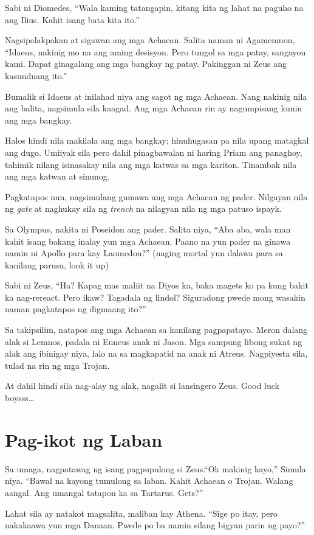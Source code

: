 \documentclass[12pt,letterpaper]{report}
\begin{document}
Sabi ni Diomedes, ``Wala kaming tatangapin, kitang kita ng lahat na paguho na ang Ilius. Kahit isang bata kita ito.''

Nagsipalakpakan at sigawan ang mga Achaean. Salita naman ni Agamemnon, ``Idaeus, nakinig mo na ang aming desisyon. Pero tungol sa mga patay, sangayon kami. Dapat ginagalang ang mga bangkay ng patay. Pakinggan ni Zeus ang kasunduang ito.''

Bumalik si Idaeus at inilahad niya ang sagot ng mga Achaean. Nang nakinig nila ang balita, nagsimula sila kaagad. Ang mga Achaean rin ay nagumpisang kunin ang mga bangkay.

Halos hindi nila makilala ang mga bangkay; hinuhugasan pa nila upang matagkal ang dugo. Umiiyak sila pero dahil pinagbawalan ni haring Priam ang panaghoy, tahimik nilang isinasakay nila ang mga katwas sa mga kariton. Tinambak nila ang mga katwan at sinunog.

Pagkatapos nun, nagsimulang gumawa ang mga Achaean ng pader. Nilgayan nila ng \textit{gate} at naghukay sila ng \textit{trench} na nilagyan nila ng mga patuso ispayk.

Sa Olympus, nakita ni Poseidon ang pader. Salita niya, ``Aba aba, wala man kahit isang bakang inalay yun mga Achaean. Paano na yun pader na ginawa namin ni Apollo para kay Laomedon?'' (naging mortal yun dalawa para sa kanilang parusa, look it up)

Sabi ni Zeus, ``Ha? Kapag mas maliit na Diyos ka, baka magets ko pa kung bakit ka nag-rereact. Pero ikaw? Tagadala ng lindol? Siguradong pwede mong wasakin naman pagkatapos ng digmaang ito?''

Sa takipsilim, natapos ang mga Achaean sa kanilang pagpapatayo. Meron dalang alak si Lemnos, padala ni Euneus anak ni Jason. Mga sampung libong sukat ng alak ang ibinigay niya, lalo na sa magkapatid na anak ni Atreus. Nagpiyesta sila, tulad na rin ng mga Trojan.

At dahil hindi sila nag-alay ng alak, nagalit si lansingero Zeus. Good luck boysss\dots

\pagebreak
\chapter{Pag-ikot ng Laban} %
Sa umaga, nagpatawag ng isang pagpupulong si Zeus.``Ok makinig kayo,'' Simula niya. ``Bawal na kayong tumulong sa laban. Kahit Achaean o Trojan. Walang aangal. Ang umangal tatapon ka sa Tartarus. Gets?''

Lahat sila ay natakot magsalita, maliban kay Athena. ``Sige po itay, pero nakakaawa yun mga Danaan. Pwede po ba namin silang bigyan parin ng payo?''
\end{document}
